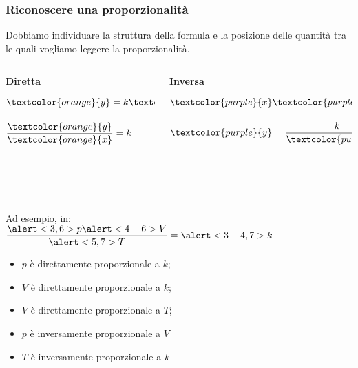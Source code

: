 \documentclass[]{beamer}
\begin{document}
\begin{frame}
\frametitle{Riconoscere una proporzionalità}
Dobbiamo individuare la \alert<1>{struttura della formula} e la posizione delle quantità tra le quali vogliamo leggere la proporzionalità.\pause
\begin{columns}
\begin{column}{0.4\textwidth}
\begin{center}
\textbf{Diretta}

\vspace{.3cm}

$ \textcolor{orange}{y} = k \textcolor{orange}{x} $~~~~~~~~~$ \dfrac{\textcolor{orange}{y}}{\textcolor{orange}{x}} = k $
\end{center}
\end{column}
\begin{column}{0.4\textwidth}
\begin{center}
\textbf{Inversa}

\vspace{.3cm}

$ \textcolor{purple}{x} \textcolor{purple}{y} = k $~~~~~~~~~$ \textcolor{purple}{y} = \dfrac{k}{\textcolor{purple}{x}} $
\end{center}
\end{column}
\end{columns}\pause

~

~

Ad esempio, in: ~~~~~~~~~~~~~~
$ \dfrac{\alert<3,6>{p}\alert<4-6>{V}}{\alert<5,7>{T}} = \alert<3-4,7>{k} $

\begin{itemize}
  \item $ p $ è \alert<3>{direttamente proporzionale} a $ k $;\pause
  \item $ V $ è \alert<4>{direttamente proporzionale} a $ k $;\pause
  \item $ V $ è \alert<5>{direttamente proporzionale} a $ T $;\pause
  \item $ p $ è \alert<6>{inversamente proporzionale} a $ V $\pause
  \item $ T $ è \alert<7>{inversamente proporzionale} a $ k $
\end{itemize}

\end{frame}
\end{document}
